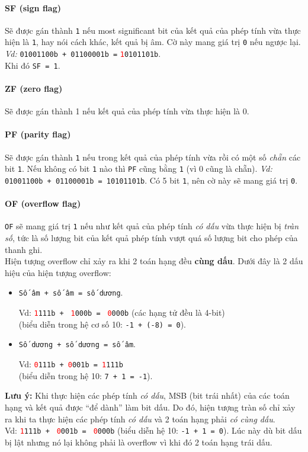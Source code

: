 \documentclass[12pt]{report}
\newcommand{\code}[1]{\texttt{#1}}
\newcommand{\codeh}[1]{\textcolor{red}{\code{#1}}}
\begin{document}
\paragraph{SF (sign flag)}
Sẽ được gán thành \code 1 nếu most significant bit của kết quả của phép tính vừa thực hiện là \code 1, hay nói cách khác, kết quả bị âm. Cờ này mang giá trị \code 0 nếu ngược lại.\\
\textit{Vd:} \code{01001100b + 01100001b =} \textcolor{red}{\code 1}\code{0101101b}.\\ 
Khi đó \code{SF = 1}.
\bigskip

\paragraph{ZF (zero flag)}
Sẽ được gán thành 1 nếu kết quả của phép tính vừa thực hiện là 0.
\bigskip 

\paragraph{PF (parity flag)}
Sẽ được gán thành \code 1 nếu trong kết quả của phép tính vừa rồi có một số \textit{chẵn} các bit \code 1. Nếu không có bit \code 1 nào thì \code{PF} cũng bằng \code 1 (vì 0 cũng là chẵn).
\textit{Vd:} \code{01001100b + 01100001b = 10101101b}. Có 5 bit \code 1, nên cờ này sẽ mang giá trị \code 0.

\paragraph{OF (overflow flag)}
\code{OF} sẽ mang giá trị \code 1 nếu như kết quả của phép tính \textit{có dấu} vừa thực hiện bị \textit{tràn số}, tức là số lượng bit của kết quả phép tính vượt quá số lượng bit cho phép của thanh ghi. \\
Hiện tượng overflow chỉ xảy ra khi  2 toán hạng đều \textbf{cùng dấu}. Dưới đây là 2 dấu hiệu của hiện tượng overflow:
\begin{itemize}
    \item \code{Số âm + số âm = số dương}.
        \par Vd: \codeh{1}\code{111b + } \codeh{1}\code{000b = } \codeh{0}\code{000b} (các hạng tử đều là 4-bit)\\(biểu diễn trong hệ cơ số 10: \code{-1 + (-8) = 0}).
    \item \code{Số dương + số dương = số âm}.
        \par Vd: \codeh{0}\code{111b + }\codeh{0}\code{001b = }\codeh{1}\code{111b}\\(biểu diễn trong hệ 10: \code{7 + 1 = -1}). 
\end{itemize}
\textbf{Lưu ý:} Khi thực hiện các phép tính \textit{có dấu}, MSB (bit trái nhất) của các toán hạng và kết quả được ``để dành'' làm bit dấu. Do đó, hiện tượng tràn số chỉ xảy ra khi ta thực hiện các phép tính \textit{có dấu} và 2 toán hạng phải \textit{có cùng dấu}.\\
Vd: \codeh{1}\code{111b + } \codeh{0}\code{001b = } \codeh{0}\code{000b} (biểu diễn hệ 10: \code{-1 + 1 = 0}). Lúc này dù bit dấu bị lật nhưng nó lại không phải là overflow vì khi đó 2 toán hạng trái dấu.
\end{document}
